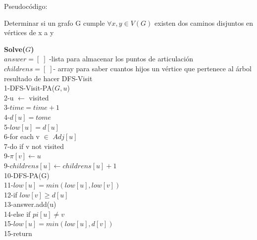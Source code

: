 \documentclass{article}
\begin{document}
    \begin{algorithm}[H] 
        Pseudoc\'odigo:
        \caption{Determinar si un grafo G cumple $\forall x,y\in V(G)$  existen dos caminos disjuntos en v\'ertices de x a y }
        \textbf{Solve($G$)\\}
        $answer=[\;]$ -lista para almacenar los puntos de articulaci\'on\\
        $childrens=[\;]$- array para saber cuantos hijos un v\'ertice que pertenece al \'arbol resultado de hacer DFS-Visit\\
        1-\hspace*{1em}DFS-Visit-PA($G,u$) \\ 
        2-\hspace*{2em}u $\leftarrow$ visited \\
        3-\hspace*{2em}$time=time+1$ \\
        4-\hspace*{2em}$d[u]=tome$\\
        5-\hspace*{2em}$low[u]=d[u]$\\ 
        6-\hspace*{2em}for each v $\in$ $Adj[u]$\\
        7-\hspace*{3em}do if v not visited\\
        9-\hspace*{4em}$\pi[v] \leftarrow u$\\
        9-\hspace*{4em}$childrens[u] \leftarrow childrens[u]+1$\\
        10-\hspace*{4em}DFS-PA(G)\\
        11-\hspace*{4em}$low[u]=min(low[u],low[v])$\\
        12-\hspace*{4em}if $low[v]\ge d[u]$\\
        13-\hspace*{5em}answer.add(u)\\
        14-\hspace*{3em}else if $pi[u]\ne v$\\
        15-\hspace*{4em}$low[u]=min(low[u],d[v])$\\ 
        15-\hspace*{2em}return\\\\

\end{algorithm}
\end{document}

